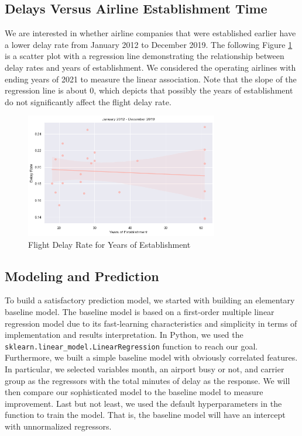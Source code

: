 \documentclass[11pt, letterpaper]{article}
\begin{document}
\subsection{Delays Versus Airline Establishment Time}
We are interested in whether airline companies that were established earlier have a lower delay rate from January 2012 to December 2019. The following Figure \ref{fig:reg_plot} is a scatter plot with a regression line demonstrating the relationship between delay rates and years of establishment. We considered the operating airlines with ending years of 2021 to measure the linear association. Note that the slope of the regression line is about 0, which depicts that possibly the years of establishment do not significantly affect the flight delay rate.

\begin{figure}[h!]
\centering
\includegraphics[width = 0.75\textwidth]{reg_plot}
\caption{Flight Delay Rate for Years of Establishment}\label{fig:reg_plot}
\end{figure}

\subsection{Modeling and Prediction}
To build a satisfactory prediction model, we started with building an elementary baseline model. The baseline model is based on a first-order multiple linear regression model due to its fast-learning characteristics and simplicity in terms of implementation and results interpretation. In Python, we used the \texttt{sklearn.linear\_model.LinearRegression} function to reach our goal. Furthermore, we built a simple baseline model with obviously correlated features. In particular, we selected variables month, an airport busy or not, and carrier group as the regressors with the total minutes of delay as the response. We will then compare our sophisticated model to the baseline model to measure improvement. Last but not least, we used the default hyperparameters in the function to train the model. That is, the baseline model will have an intercept with unnormalized regressors.
\end{document}
